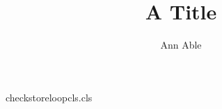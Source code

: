 \begin{filecontents*}[force]{checkstoreloopcls.cls}
\newcount\aucount
\def\author#1{\advance\aucount by 1 \gdef\@author{#1}}
\def\closing#1{\g@addto@macro\@closing{#1}}\def\@closing{}
\newcommand{\printclosing}{\@closing}
\renewcommand\maketitle{\par{\@title\par}\ifnum\aucount>0 {\@author\par}\fi}
\end{filecontents*}
\documentclass{checkstoreloopcls}
\title{A Title}\author{Ann Able}
\closing{\def\x{\begin{center}\end{center}\x}\x}
\maketitle
\section{One}
Body text one.

